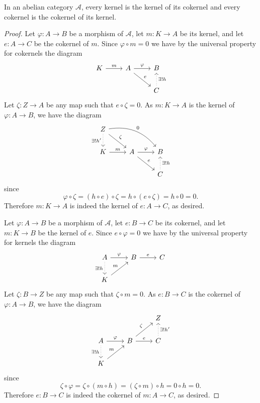 \documentclass[10pt]{amsart}
\begin{document}
\begin{lem}\label{lem4}
  In an abelian category $\mathcal{A}$, every kernel is the kernel of its cokernel and every cokernel is the cokernel of its kernel.

  \begin{proof}
    Let $\varphi : A \rightarrow B$ be a morphism of $\mathcal{A}$, let $m : K \rightarrow A$ be its kernel, and let $e : A \rightarrow C$ be the cokernel of $m$.
    Since $\varphi \circ m = 0$ we have by the universal property for cokernels the diagram
    $$\begin{tikzcd}
      K \arrow{r}{m} &A \arrow{r}{\varphi} \arrow{rd}{e} & B\\
      & & C\arrow[swap,dotted]{u}{\exists ! h}
    \end{tikzcd}$$
    Let $\zeta : Z \rightarrow A$ be any map such that $e \circ \zeta = 0$.
    As $m : K \rightarrow A$ is the kernel of $\varphi : A \rightarrow B$, we have the diagram
    $$\begin{tikzcd}
      Z \arrow{rd}{\zeta} \arrow[swap, dotted]{d}{\exists !h^\prime}\arrow[bend left]{rrd}{0}\\
      K \arrow{r}{m} & A\arrow{r}{\varphi} \arrow{rd}{e}& B\\
      & & C \arrow[dotted,swap]{u}{\exists ! h}
    \end{tikzcd}$$
    since 
    $$\varphi \circ \zeta = (h \circ e) \circ \zeta = h \circ (e \circ \zeta) = h \circ 0 = 0.$$
    Therefore $m : K \rightarrow A$ is indeed the kernel of $e : A \rightarrow C$, as desired.

    Let $\varphi : A \rightarrow B$ be a morphism of $\mathcal{A}$, let $e : B \rightarrow C$ be its cokernel, and let $m : K \rightarrow B$ be the kernel of $e$.
    Since $e \circ \varphi = 0$ we have by the universal property for kernels the diagram
    $$\begin{tikzcd}
      A \arrow{r}{\varphi}\arrow[dotted,swap]{d}{\exists ! h} & B \arrow{r}{e} & C\\
      K \arrow{ur}{m}
    \end{tikzcd}$$
    Let $\zeta : B \rightarrow Z$ be any map such that $\zeta \circ m = 0$.
    As $e : B \rightarrow C$ is the cokernel of $\varphi : A \rightarrow B$, we have the diagram
    $$\begin{tikzcd}
      & & Z\\
      A \arrow{r}{\varphi}\arrow[dotted,swap]{d}{\exists ! h} & B \arrow{r}{e}\arrow{ru}{\zeta} & C \arrow[dotted,swap]{u}{\exists ! h^\prime}\\
      K \arrow{ur}{m} & & 
    \end{tikzcd}$$
    since 
    $$\zeta \circ \varphi = \zeta \circ (m \circ h) = (\zeta \circ m) \circ h = 0 \circ h = 0.$$
    Therefore $e : B \rightarrow C$ is indeed the cokernel of $m : A \rightarrow C$, as desired.
  \end{proof}
\end{lem}
\end{document}
